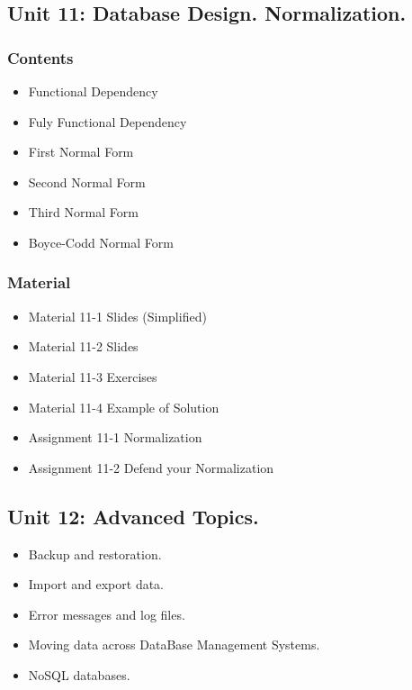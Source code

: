 \documentclass[catalan, a4paper, 12pt, titlepage]{article}
\begin{document}
  \subsection{Unit 11: Database Design. Normalization.}

  \subsubsection{Contents}
  \begin{itemize}
	\item Functional Dependency
	\item Fuly Functional Dependency
	\item First Normal Form
	\item Second Normal Form
	\item Third Normal Form
	\item Boyce-Codd Normal Form
  \end{itemize}

  \subsubsection{Material}
  \begin{itemize}
	  \item Material 11-1 Slides (Simplified)
	  \item Material 11-2 Slides
	  \item Material 11-3 Exercises
	  \item Material 11-4 Example of Solution
	  \item Assignment 11-1 Normalization
	  \item Assignment 11-2 Defend your Normalization
  \end{itemize}


  \subsection{Unit 12: Advanced Topics.}

  \begin{itemize}
	\item Backup and restoration.
	\item Import and export data.
	\item Error messages and log files.
	\item Moving data across DataBase Management Systems.
	\item NoSQL databases.
  \end{itemize}
\end{document}
